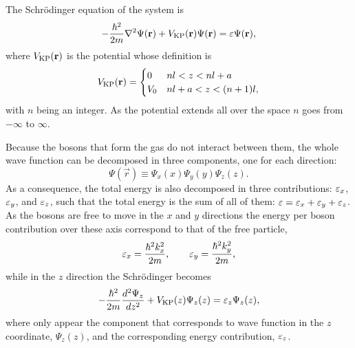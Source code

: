 The Schrödinger equation of the system is
%
\begin{equation}
	-\frac{\hbar^2}{2m} \nabla^2 \Psi(\mathbf r) + V_{\mathrm{KP}}(\mathbf r) \Psi(\mathbf r) = {\varepsilon} \Psi(\mathbf r),
\end{equation}
%
where $V_{\mathrm{KP}}(\mathbf r)$ is the {\KP} potential whose definition is
%
\begin{equation}
	\label{eq:kronig-penney-potential}
	V_{\mathrm{KP}}(\mathbf r) = \begin{cases}
		0   & nl < z < nl + a      \\
		V_0 & nl + a < z < (n+1)l,
	\end{cases}
\end{equation}
%
with $n$ being an integer. As the potential extends all over the space $n$ goes
from $-\infty$ to $\infty$.

Because the bosons that form the gas do not interact between them, the whole
wave function can be decomposed in three components, one for each direction:
%
\begin{equation}
	\Psi(\vec r) \equiv \Psi_x(x) \Psi_y(y) \Psi_z(z).
\end{equation}
%
As a consequence, the total energy is also decomposed in three contributions:
${{\varepsilon}_x}$, ${{\varepsilon}_y}$, and ${\varepsilon}_{z}$, such that the total energy is the sum of all of them:
${\varepsilon} = {{\varepsilon}_x} + {{\varepsilon}_y} + {\varepsilon}_{z}$. As the bosons are free to move in the $x$ and $y$
directions the energy per boson contribution over these axis correspond to that
of the free particle,
%
\begin{equation}
	{{\varepsilon}_x} = \frac{\hbar^2 k_x^2}{2m},  \qquad {{\varepsilon}_y} = \frac{\hbar^2 k_y^2}{2m},
\end{equation}
%
while in the $z$ direction the Schrödinger becomes
%
\begin{equation}
	-\frac{\hbar^2}{2m} \frac{d^2 \Psi_z}{dz^2} + V_{\mathrm{KP}}(z) \Psi_z(z) = {\varepsilon}_{z} \Psi_z(z),
\end{equation}
%
where only appear the component that corresponds to wave function in the $z$
coordinate, $\Psi_z(z)$, and the corresponding energy contribution, ${\varepsilon}_{z}$.

